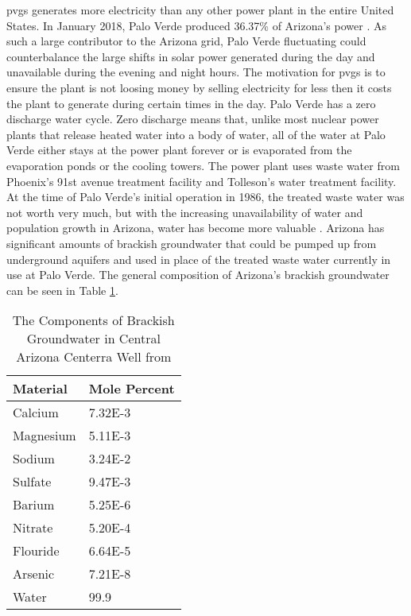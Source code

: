 \ac{pvgs} generates more electricity than any other power plant in the entire United States. In January 2018, Palo Verde produced 36.37\% of Arizona's power \cite{eia2018}.  As such a large contributor to the Arizona grid, Palo Verde fluctuating could counterbalance the large shifts in solar power generated during the day and unavailable during the evening and night hours. The motivation for \ac{pvgs} is to ensure the plant is not loosing money by selling electricity for less then it costs the plant to generate during certain times in the day. Palo Verde has a zero discharge water cycle.  Zero discharge means that, unlike most nuclear power plants that release heated water into a body of water, all of the water at Palo Verde either stays at the power plant forever or is evaporated from the evaporation ponds or the cooling towers.  The power plant uses waste water from Phoenix's 91st avenue treatment facility and Tolleson's water treatment facility. At the time of Palo Verde's initial operation in 1986, the treated waste water was not worth very much, but with the increasing unavailability of water and population growth in Arizona, water has become more valuable \cite{Brown2018}.  Arizona has significant amounts of brackish groundwater that could be pumped up from underground aquifers and used in place of the treated waste water currently in use at Palo Verde. The general composition of Arizona's brackish groundwater can be seen in Table \ref{ArizonaWater}.

\begin{table}[h!]
\centering
\caption{The Components of Brackish Groundwater in Central Arizona Centerra Well from \cite{USBureauofReclamation2006}}
\label{ArizonaWater}
\begin{tabular}{|l|l|}
\hline
\textbf{Material}                                                & \textbf{Mole Percent} \\ \hline
Calcium  & 7.32E-3     \\ \hline
Magnesium & 5.11E-3      \\ \hline
Sodium & 3.24E-2\\ \hline
Sulfate & 9.47E-3 \\ \hline
Barium & 5.25E-6 \\ \hline
Nitrate & 5.20E-4 \\ \hline
Flouride & 6.64E-5 \\ \hline
Arsenic & 7.21E-8 \\ \hline
Water                                                      & 99.9         \\ \hline
\end{tabular}
\end{table}

